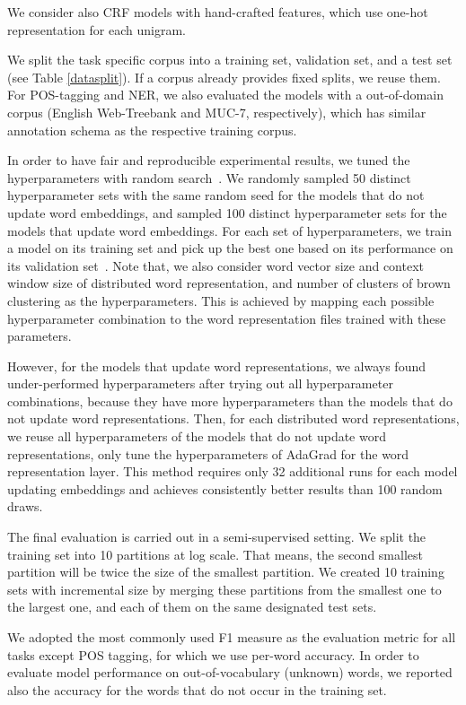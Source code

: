 We consider also CRF models with hand-crafted features, which use one-hot representation for each unigram.

We split the task specific corpus into a training set, validation set, and a test set (see Table \ref{datasplit}). If a corpus already provides fixed splits, we reuse them. For POS-tagging and NER, we also evaluated the models with a out-of-domain corpus (English Web-Treebank and MUC-7, respectively), which has similar annotation schema as the respective training corpus.




In order to have fair and reproducible experimental results, we tuned the hyperparameters with random search~\cite{bergstra2012random}. 
We randomly sampled 50 distinct hyperparameter sets with the same random seed for the models that do not update word embeddings, and sampled 100 distinct hyperparameter sets for the models that update word embeddings. 
For each set of hyperparameters, we train a model on its training set and pick up the best one based on its performance on its validation set~\cite{turian2010word}. 
Note that, we also consider word vector size and context window size of distributed word representation, and number of clusters of brown clustering as the hyperparameters.
This is achieved by mapping each possible hyperparameter combination to the word representation files trained with these parameters. 

However, for the models that update word representations, we always found under-performed hyperparameters after trying out all hyperparameter combinations, because they have more hyperparameters than the models that do not update word representations. Then, for each distributed word representations, we reuse all hyperparameters of the models that do not update word representations, only tune the hyperparameters of AdaGrad for the word representation layer. This method requires only 32 additional runs for each model updating embeddings and achieves consistently better results than 100 random draws.

The final evaluation is carried out in a semi-supervised setting. We split the training set into 10 partitions at log scale. That means, the second smallest partition will be twice the size of the smallest partition. We created 10 training sets with incremental size by merging these partitions from the smallest one to the largest one, and each of them on the same designated test sets. 

We adopted the most commonly used F1 measure as the evaluation metric for all tasks except POS tagging, for which we use per-word accuracy. In order to evaluate model performance on out-of-vocabulary (unknown) words, we reported also the accuracy for the words that do not occur in the training set.

